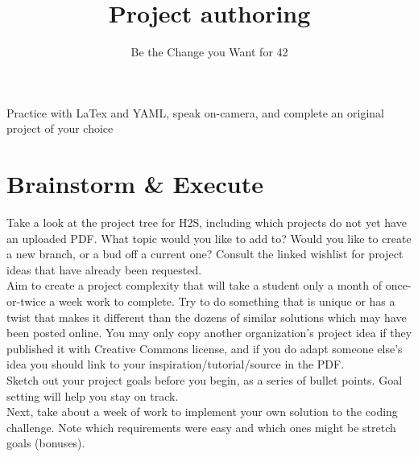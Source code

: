 \documentclass{42-en}
\begin{document}
\title{Project authoring}
\subtitle{Be the Change you Want for 42}


\summary
{
	Practice with LaTex and YAML, speak on-camera, and complete an original project of your choice
}

\maketitle

\tableofcontents


\chapter{Brainstorm \& Execute}

Take a look at the project tree for H2S, including which projects do not yet have an uploaded PDF. What topic would you like to add to? Would you like to create a new branch, or a bud off a current one? Consult the linked wishlist for project ideas that have already been requested.\\

Aim to create a project complexity that will take a student only a month of once-or-twice a week work to complete. Try to do something that is unique or has a twist that makes it different than the dozens of similar solutions which may have been posted online. You may only copy another organization's project idea if they published it with Creative Commons license, and if you do adapt someone else's idea you should link to your inspiration/tutorial/source in the PDF.\\

Sketch out your project goals before you begin, as a series of bullet points. Goal setting will help you stay on track.\\

Next, take about a week of work to implement your own solution to the coding challenge. Note which requirements were easy and which ones might be stretch goals (bonuses).
\end{document}
